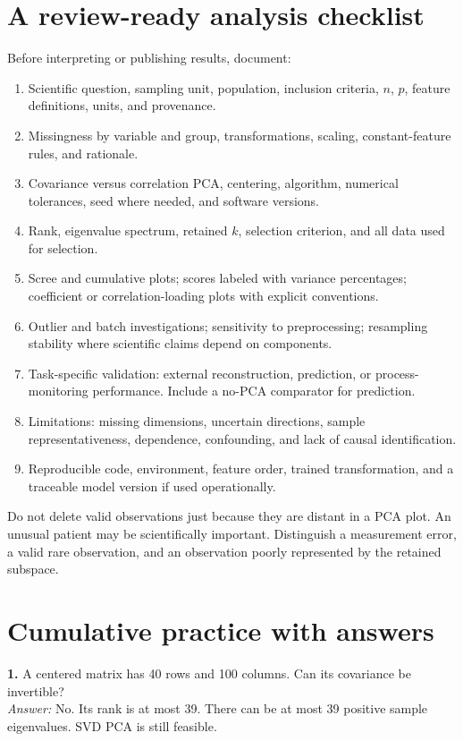 \documentclass[11pt]{article}
\begin{document}
\section{A review-ready analysis checklist}
Before interpreting or publishing results, document:
\begin{enumerate}
\item Scientific question, sampling unit, population, inclusion criteria, $n$, $p$, feature definitions, units, and provenance.
\item Missingness by variable and group, transformations, scaling, constant-feature rules, and rationale.
\item Covariance versus correlation PCA, centering, algorithm, numerical tolerances, seed where needed, and software versions.
\item Rank, eigenvalue spectrum, retained $k$, selection criterion, and all data used for selection.
\item Scree and cumulative plots; scores labeled with variance percentages; coefficient or correlation-loading plots with explicit conventions.
\item Outlier and batch investigations; sensitivity to preprocessing; resampling stability where scientific claims depend on components.
\item Task-specific validation: external reconstruction, prediction, or process-monitoring performance. Include a no-PCA comparator for prediction.
\item Limitations: missing dimensions, uncertain directions, sample representativeness, dependence, confounding, and lack of causal identification.
\item Reproducible code, environment, feature order, trained transformation, and a traceable model version if used operationally.
\end{enumerate}
Do not delete valid observations just because they are distant in a PCA plot. An unusual patient may be scientifically important. Distinguish a measurement error, a valid rare observation, and an observation poorly represented by the retained subspace.

\section{Cumulative practice with answers}
\textbf{1.} A centered matrix has 40 rows and 100 columns. Can its covariance be invertible?\\
\emph{Answer:} No. Its rank is at most 39. There can be at most 39 positive sample eigenvalues. SVD PCA is still feasible.
\end{document}
